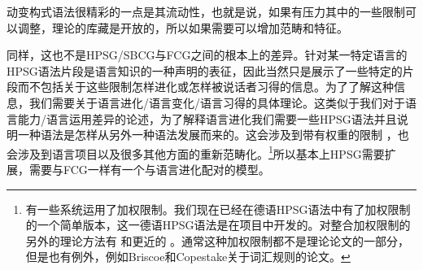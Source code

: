 

动变构式语法很精彩的一点是其流动性，也就是说，如果有压力其中的一些限制可以调整，理论的库藏是开放的，所以如果需要可以增加范畴和特征。

同样，这也不是HPSG/SBCG与FCG之间的根本上的差异。针对某一特定语言的HPSG语法片段是语言知识的一种声明的表征，因此当然只是展示了一些特定的片段而不包括关于这些限制怎样进化或怎样被说话者习得的信息。为了了解这种信息，我们需要关于语言进化/语言变化/语言习得的具体理论。这类似于我们对于语言能力/语言运用差异的论述，为了解释语言进化我们需要一些HPSG语法并且说明一种语法是怎样从另外一种语法发展而来的。这会涉及到带有权重的限制 ，也会涉及到语言项目以及很多其他方面的重新范畴化。\footnote{%
有一些系统运用了加权限制。我们现在已经在德语HPSG语法中有了加权限制的一个简单版本，这一德语HPSG语法是在\verbmobil 项目中开发的\citep{MK2000a}。对整合加权限制的另外的理论方法有 和更近的 。通常这种加权限制都不是理论论文的一部分，但是也有例外，例如Briscoe和Copestake关于词汇规则的论文\citep{BC99a}。  
}所以基本上HPSG需要扩展，需要与FCG一样有一个与语言进化配对的模型。
